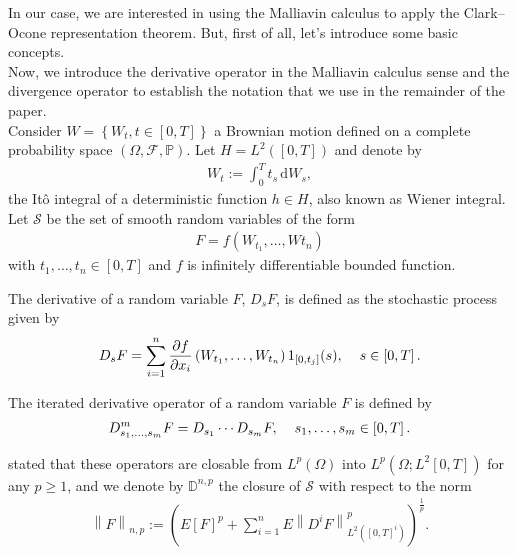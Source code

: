 \documentclass[a4paper,10pt]{article}
\renewcommand{\d}{\,\mathrm{d}}
\newcommand{\1}{\mathbf{1}}
\begin{document}
In our case, we are interested in using the Malliavin calculus to apply the Clark–Ocone representation theorem. But, first of all, let's introduce some basic concepts.\\ 

Now, we introduce the derivative operator in the Malliavin calculus sense and the divergence operator to establish the notation that we use in the remainder of the paper.\\

Consider $W=\left\{W_{t}, t\in \left[0,T\right]\right\}$ a Brownian motion defined on a complete probability space $\left(\Omega, \mathcal{F}, \mathbb{P}\right)$. Let $H=L^{2}(\left[0,T\right])$ and denote by 
\begin{eqnarray*}
W_{t} := \int^{T}_{0} t_{s} \d W_{s},
\end{eqnarray*}
the It\^o integral of a deterministic function $h \in H$, also known as Wiener integral. Let $\mathcal{S}$ be the set of smooth random variables of the form
\begin{eqnarray*}
F=f\left(W_{t_{1}}, \ldots, W{t_{n}}\right)
\end{eqnarray*}
with $t_{1}, \ldots, t_{n} \in \left[0,T\right]$ and $f$ is infinitely differentiable bounded function.

\medbreak

The derivative of a random variable $F$, $D_{s}F$, is defined as the stochastic process given by
\begin{eqnarray*}
D_{s}F = \sum^{n}_{i=1} \frac{\partial f}{\partial x_{i}}\left(W_{t_{1}}, \ldots, W_{t_{n}}\right)1_{\left[0, t_{j}\right]}(s), \hspace{0.4cm} s \in \left[0,T\right].
\end{eqnarray*}

The iterated derivative operator of a random variable $F$ is defined by
\begin{eqnarray*}
D^{m}_{s_{1}, \ldots, s_{m}} F = D_{s_{1}} \cdots D_{s_{m}}F, \hspace{0.4cm} s_{1}, \ldots, s_{m} \in \left[0,T\right].
\end{eqnarray*}

\cite{Nualart} stated that these operators are closable from $L^{p}(\Omega)$ into $L^{p}(\Omega; L^{2}\left[0,T\right])$ for any $p\geq1$, and we denote by $\mathbb{D}^{n,p}$ the closure of $\mathcal{S}$ with respect to the norm
\begin{eqnarray*}
\left\|F\right\|_{n,p} := \left(E\left[F\right]^{p} + \sum^{n}_{i=1} E\left\|D^{i} F\right\|^{p}_{L^{2}\left(\left[0,T\right]^{i}\right)} \right)^{\frac{1}{p}}.
\end{eqnarray*}
\end{document}
